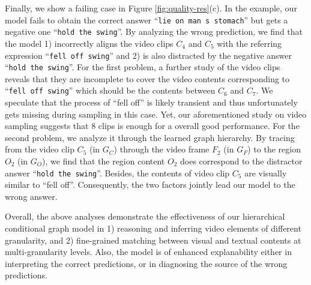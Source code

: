 \documentclass[letterpaper]{article} \usepackage{aaai21}  \usepackage{times}  \usepackage{helvet} \usepackage{courier}  \usepackage[hyphens]{url}  \usepackage{graphicx} \urlstyle{rm} \def\UrlFont{\rm}  \usepackage{natbib}  \usepackage{caption} \usepackage{color, colortbl}
\begin{document}
Finally, we show a failing case in Figure \ref{fig:quality-res}(c). In the example, our model fails to obtain the correct answer ``\texttt{lie on man s stomach}'' but gets a negative one ``\texttt{hold the swing}''. By analyzing the wrong prediction, we find that the model 1) incorrectly aligns the video clips $C_4$ and $C_5$ with the referring expression ``\texttt{fell off swing}'' and 2) is also distracted by the negative answer ``\texttt{hold the swing}''. For the first problem, a further study of the video clips reveals that they are incomplete to cover the video contents corresponding to ``\texttt{fell off swing}'' which should be the contents between $C_6$ and $C_7$. We speculate that the process of ``fell off'' is likely transient and thus unfortunately gets missing during sampling in this case. Yet, our aforementioned study on video sampling suggests that 8 clips is enough for a overall good performance. For the second problem, we analyze it through the learned graph hierarchy. By tracing from the video clip $C_5$ (in $G_C$) through the video frame $F_2$ (in $G_F$) to the region $O_2$ (in $G_O$), we find that the region content $O_2$ does correspond to the distractor answer ``\texttt{hold the swing}''. Besides, the contents of video clip $C_5$ are visually similar to ``fell off''. Consequently, the two factors jointly lead our model to the wrong answer.

Overall, the above analyses demonstrate the effectiveness of our hierarchical conditional graph model in 1) reasoning and inferring video elements of different granularity, and 2) fine-grained matching between visual and textual contents at multi-granularity levels. Also, the model is of enhanced explanability either in interpreting the correct predictions, or in diagnosing the source of the wrong predictions.

\begin{figure*}[t!]
 \centering
 \caption{Visualization of question-answering results in NExT-QA \cite{xiao2021next}. The ground-truth answers and our predictions are highlighted in \textbf{bold} and \underline{underline} respectively.  \textcolor{blue}{Blue}: Self-attention weights $\beta$. \textcolor{orange}{Orange}: weights of adjacency matrix $A$ and query condition $\alpha$. (Please zoom in for better view of the object bounding boxes.)}
 \label{fig:quality-res}
 \vspace{-1.0em}
\end{figure*} \clearpage
\pagebreak
\end{document}
